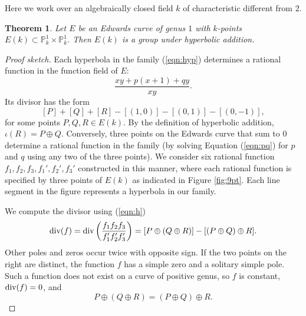 \documentclass[12pt]{article}
\newtheorem{theorem}{Theorem}[subsection]
\newcommand{\ring}[1]{\mathbb{#1}}
\newcommand{\op}[1]{\hbox{#1}}
\begin{document}
Here we work over an algebraically closed field $k$ of characteristic
different from $2$.

\begin{theorem} Let $E$ be an Edwards curve of genus $1$ with
  $k$-points $E(k)\subset \ring{P}_k^1\times \ring{P}_k^1$.  Then
  $E(k)$ is a group under hyperbolic addition.
\end{theorem}

\begin{proof}[Proof sketch] 
  Each hyperbola in the family (\ref{eqn:hyp}) determines a rational
  function in the function field of $E$:
\[
\frac{x y + p (x+1) + q y}{x y}.
\]
Its divisor has the form
\begin{equation}\label{eqn:h}
[P] + [Q] + [R] - [(1,0)] - [(0,1)] - [(0,-1)],
\end{equation}
for some points $P,Q,R\in E(k)$.  By the definition of hyperbolic
addition, $\iota(R) = P\oplus Q$.  Conversely, three points on the Edwards
curve that sum to $0$ determine a rational function in the family (by solving
Equation (\ref{eqn:pq}) for $p$ and $q$ using any two of the three points). We
consider six rational function $f_1,f_2,f_3,f_1',f_2',f_3'$
constructed in this manner, where each rational function is specified
by three points of $E(k)$ as indicated in Figure {\ref{fig:9pt}}.  Each line
segment in the figure represents a hyperbola in our family.

We compute the divisor using (\ref{eqn:h})
\[
\op{div} (f) =\op{div}\left(\frac{f_1 f_2 f_3}{f_1' f_2' f_3'}\right) = 
[P\oplus (Q\oplus R)] - [(P\oplus Q) \oplus R].
\]
Other poles and zeros occur twice with opposite sign.
If the two points on the right are distinct, the function $f$ has a
simple zero and a solitary simple pole.  Such a function does not
exist on a curve of positive genus, so $f$ is constant, $\op{div}(f)=0$, and
\[
P\oplus (Q\oplus R) = (P\oplus Q) \oplus R.
\]
\end{proof}
\end{document}
